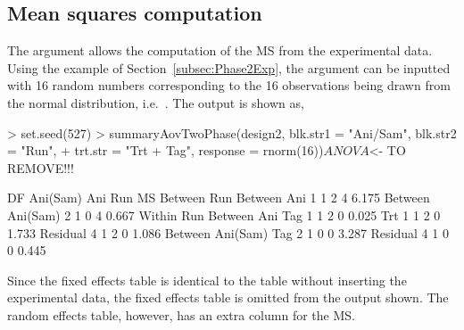 \documentclass[article]{jss}
\begin{document}
\subsection{Mean squares computation}
The argument  allows the computation of the MS from the experimental data. Using the example of Section~\ref{subsec:Phase2Exp}, the  argument can be inputted with 16 random numbers corresponding to the 16 observations being drawn from the normal distribution, i.e.\ . The output is shown as,
\begin{CodeChunk}
\begin{CodeInput} 
> set.seed(527)
> summaryAovTwoPhase(design2, blk.str1 = "Ani/Sam", blk.str2 = "Run", 
+  trt.str = "Trt + Tag", response = rnorm(16))$ANOVA
$<- TO REMOVE!!!
\end{CodeInput}
\begin{CodeOutput} 
                    DF Ani(Sam) Ani Run MS   
Between Run                                  
   Between Ani      1  1        2   4   6.175
   Between Ani(Sam) 2  1        0   4   0.667
Within Run                                   
   Between Ani                               
      Tag           1  1        2   0   0.025
      Trt           1  1        2   0   1.733
      Residual      4  1        2   0   1.086
   Between Ani(Sam)                          
      Tag           2  1        0   0   3.287
      Residual      4  1        0   0   0.445
\end{CodeOutput}
\end{CodeChunk}  
Since the fixed effects table is identical to the table without inserting the experimental data, the fixed effects table is omitted from the output shown. The random effects table, however, has an extra column for the MS.
\end{document}
